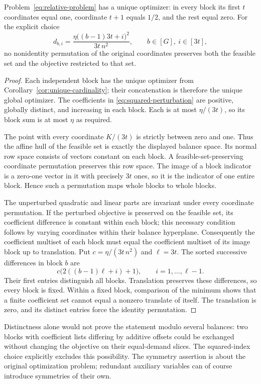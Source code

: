 \begin{proposition}
\label{prop:relative-asymmetry}
Problem~\eqref{eq:relative-problem} has a unique optimizer: in every
block its first $t$ coordinates equal one, coordinate $t+1$ equals
$1/2$, and the rest equal zero. For the explicit choice
\begin{equation}\label{eq:squared-perturbation}
 d_{b,i}=\frac{\eta\bigl((b-1)3t+i\bigr)^2}{3t\,n^2},
 \qquad b\in[G],\ i\in[3t],
\end{equation}
no nonidentity permutation of the original coordinates preserves both
the feasible set and the objective restricted to that set.
\end{proposition}
\begin{proof}
Each independent block has the unique optimizer from
Corollary~\ref{cor:unique-cardinality}; their concatenation is therefore
the unique global optimizer. The coefficients in
\eqref{eq:squared-perturbation} are positive, globally distinct, and
increasing in each block. Each is at most $\eta/(3t)$, so its block
sum is at most $\eta$ as required.

The point with every coordinate $K/(3t)$ is strictly between zero and
one. Thus the affine hull of the feasible set is exactly the displayed
balance space. Its normal row space consists of vectors constant on each
block. A feasible-set-preserving coordinate permutation preserves this
row space. The image of a block indicator is a zero-one vector in it
with precisely $3t$ ones, so it is the indicator of one entire block.
Hence such a permutation maps whole blocks to whole blocks.

The unperturbed quadratic and linear parts are invariant under every
coordinate permutation. If the perturbed objective is preserved on the
feasible set, its coefficient difference is constant within each block;
this necessary condition follows by varying coordinates within their
balance hyperplane. Consequently the coefficient multiset of each block
must equal the coefficient multiset of its image block up to translation.
Put $c=\eta/(3t\,n^2)$ and $\ell=3t$. The sorted successive differences
in block $b$ are
\[
 c\bigl(2((b-1)\ell+i)+1\bigr),\qquad i=1,\ldots,\ell-1.
\]
Their first entries distinguish all blocks. Translation preserves these
differences, so every block is fixed. Within a fixed block, comparison
of the minimum shows that a finite coefficient set cannot equal a
nonzero translate of itself. The translation is zero, and its distinct
entries force the identity permutation.
\end{proof}
Distinctness alone would not prove the statement modulo several balances:
two blocks with coefficient lists differing by additive offsets could be
exchanged without changing the objective on their equal-demand slices.
The squared-index choice explicitly excludes this possibility. The
symmetry assertion is about the original optimization problem; redundant
auxiliary variables can of course introduce symmetries of their own.

